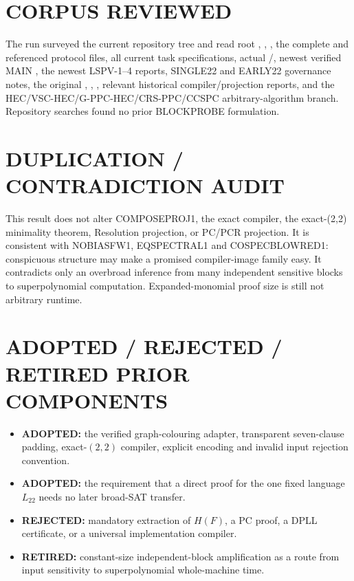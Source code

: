 \documentclass[11pt]{article}
\newcommand{\Ltwo}{L_{22}}
\begin{document}
\section{CORPUS REVIEWED}
The run surveyed the current repository tree and read root ,
, , the complete
 and referenced protocol files, all
current task specifications, actual /, newest
verified MAIN , the
newest LSPV-1--4 reports, SINGLE22 and EARLY22 governance notes, the original
,
, , relevant historical
compiler/projection reports, and the HEC/VSC-HEC/G-PPC-HEC/CRS-PPC/CCSPC
arbitrary-algorithm branch.  Repository searches found no prior
BLOCKPROBE formulation.

\section{DUPLICATION / CONTRADICTION AUDIT}
This result does not alter COMPOSEPROJ1, the exact compiler, the exact-(2,2)
minimality theorem, Resolution projection, or PC/PCR projection.  It is
consistent with NOBIASFW1, EQSPECTRAL1 and COSPECBLOWRED1: conspicuous
structure may make a promised compiler-image family easy.  It contradicts
only an overbroad inference from many independent sensitive blocks to
superpolynomial computation.  Expanded-monomial proof size is still not
arbitrary runtime.

\section{ADOPTED / REJECTED / RETIRED PRIOR COMPONENTS}
\begin{itemize}[leftmargin=*]
\item \textbf{ADOPTED:} the verified graph-colouring adapter, transparent
seven-clause padding, exact-$(2,2)$ compiler, explicit encoding and invalid
input rejection convention.
\item \textbf{ADOPTED:} the requirement that a direct proof for the one fixed
language $\Ltwo$ needs no later broad-SAT transfer.
\item \textbf{REJECTED:} mandatory extraction of $H(F)$, a PC proof, a DPLL
certificate, or a universal implementation compiler.
\item \textbf{RETIRED:} constant-size independent-block amplification as a
route from input sensitivity to superpolynomial whole-machine time.
\end{itemize}
\end{document}
